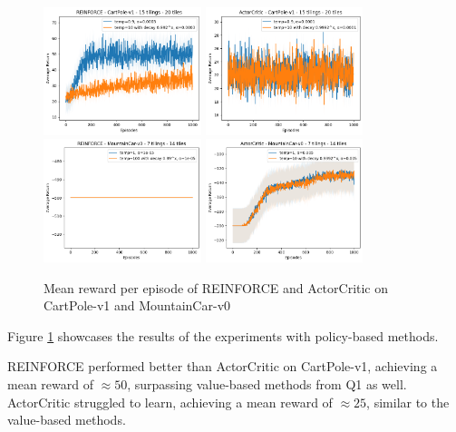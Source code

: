 \documentclass{article}
\begin{document}
\begin{figure}[htbp]
\centering
\includegraphics[width=0.41\textwidth]{q2_1.png}
\includegraphics[width=0.41\textwidth]{q2_2.png}\\
\includegraphics[width=0.41\textwidth]{q2_3.png}
\includegraphics[width=0.41\textwidth]{q2_4.png}
\caption{Mean reward per episode of REINFORCE and ActorCritic on CartPole-v1 and MountainCar-v0}\label{fig:q3}
\end{figure}




Figure \ref{fig:q3} showcases the results of the experiments with policy-based methods.




REINFORCE performed better than ActorCritic on CartPole-v1, achieving a mean reward of $\approx 50$, surpassing
value-based methods from Q1 as well. ActorCritic struggled to learn, achieving a mean reward of $\approx 25$,
similar to the value-based methods.
\end{document}
